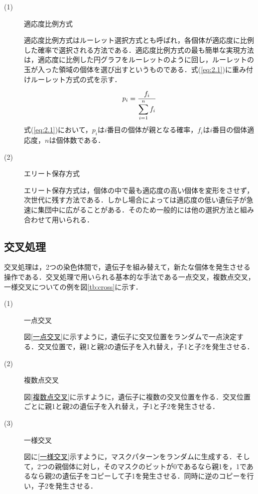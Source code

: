 \begin{description}
\item[ (1) ]適応度比例方式

適応度比例方式はルーレット選択方式とも呼ばれ，各個体が適応度に比例した確率で選択される方法である．適応度比例方式の最も簡単な実現方法は，適応度に比例した円グラフをルーレットのように回し，ルーレットの玉が入った領域の個体を選び出すというものである．式(\ref{eq:2.1})に重み付けルーレット方式の式を示す．



\begin{equation}
\vspace{1.0cm}
{p_i}=\frac{f_i}{\displaystyle\sum_{i=1}^{n}f_i}
\label{eq:2.1}
\vspace{-0.5cm}
\end{equation}
式(\ref{eq:2.1})において，$p_i$は$i$番目の個体が親となる確率，$f_i$は$i$番目の個体適応度，$n$は個体数である．

\item[ (2) ]エリート保存方式

エリート保存方式は，個体の中で最も適応度の高い個体を変形をさせず，次世代に残す方法である．しかし場合によっては適応度の低い遺伝子が急速に集団中に広がることがある．そのため一般的には他の選択方法と組み合わせて用いられる．

\end{description}

\newpage

\subsection{交叉処理}
\label{sec2.1.4}

交叉処理は，2つの染色体間で，遺伝子を組み替えて，新たな個体を発生させる操作である．交叉処理で用いられる基本的な手法である一点交叉，複数点交叉，一様交叉についての例を図\ref{tb:cross}に示す．



\begin{description}
\item[ (1) ]一点交叉

図\ref{一点交叉}に示すように，遺伝子に交叉位置をランダムで一点決定する．交叉位置で，親1と親2の遺伝子を入れ替え，子1と子2を発生させる．


\item[ (2) ]複数点交叉

図\ref{複数点交叉}に示すように，遺伝子に複数の交叉位置を作る．交叉位置ごとに親1と親2の遺伝子を入れ替え，子1と子2を発生させる．

\item[ (3) ]一様交叉

図に\ref{一様交叉}示すように，マスクパターンをランダムに生成する．そして，2つの親個体に対し，そのマスクのビットが0であるなら親1を，1であるなら親2の遺伝子をコピーして子1を発生させる．同時に逆のコピーを行い，子2を発生させる．

\end{description}

